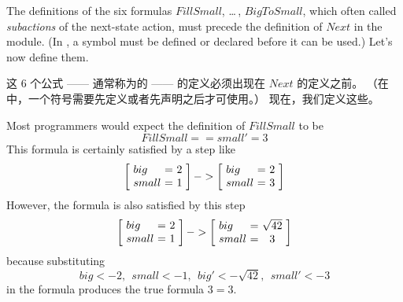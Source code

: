 \begin{en}
The definitions of the six formulas $FillSmall$, \ldots\,, $BigToSmall$,
which often called 
\emph{subactions} of the next-state action, must
precede the definition of $Next$ in the module.  (In \tlaplus, a
symbol must be defined or declared before it can be used.)  Let's now
define them.  
\end{en}
\begin{ch}
  这 6 个公式 —— 通常称为\tlanextstateaction{}的%
  \emph{\tlasubaction{}} —— 
  的定义必须出现在 $Next$ 的定义之前。
  （在 \tlaplus 中，一个符号需要先定义或者先声明之后才可使用。）
  现在，我们定义这些\tlasubaction{}。
\end{ch}

\begin{en}
Most programmers would expect the definition of $FillSmall$ to be
 \[ FillSmall == small' = 3 \]
This formula is certainly satisfied by a step like
 \[ \dhstate{2}{1} -> \dhstate{2}{3}
 \]
However, the formula is also satisfied by this step
  \[ \dhstate{2}{1} -> \dhstate{\sqrt{42}}{3}
 \]
because substituting
 \[ big <- 2, \ \ small <- 1, \ \ big' <- \sqrt{42}, \ \ small' <- 3
 \]
in the formula produces the true formula $3=3$.  
\end{en}

